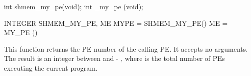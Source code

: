 
\synC

int shmem_my_pe(void);
int _my_pe (void);

\synF 

INTEGER SHMEM_MY_PE, ME
MYPE = SHMEM_MY_PE()
ME = MY_PE ()


{
	This function returns the \ac{PE} number of the calling
  \ac{PE}.   It accepts no arguments.	The result is an integer between  and
   - , where  is the total number of \ac{PE}s executing  the  current
  program.
}
{



}
\eAPI
